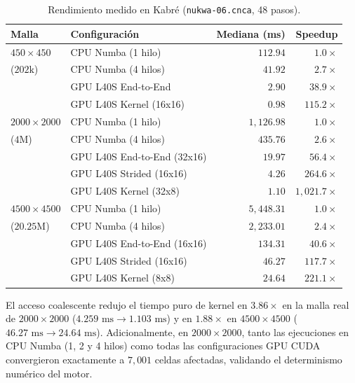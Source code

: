 \documentclass[twocolumn,10pt]{article}
\begin{document}
\begin{table}[H]
\centering
\caption{Rendimiento medido en Kabré (\texttt{nukwa-06.cnca}, 48 pasos).}
\label{tab:bench}
\small
\begin{tabular}{@{}llrr@{}}
\toprule
Malla & Configuración & Mediana (ms) & Speedup \\
\midrule
$450\times 450$   & CPU Numba (1 hilo)         & $112.94$  & $1.0\times$ \\
($202\text{k}$)   & CPU Numba (4 hilos)        & $41.92$   & $2.7\times$ \\
                  & GPU L40S End-to-End        & $2.90$    & $38.9\times$ \\
                  & GPU L40S Kernel (16x16)    & $0.98$    & $115.2\times$ \\
\midrule
$2000\times 2000$ & CPU Numba (1 hilo)         & $1{,}126.98$ & $1.0\times$ \\
($4\text{M}$)     & CPU Numba (4 hilos)        & $435.76$  & $2.6\times$ \\
                  & GPU L40S End-to-End (32x16)& $19.97$   & $56.4\times$ \\
                  & GPU L40S Strided (16x16)   & $4.26$    & $264.6\times$ \\
                  & GPU L40S Kernel (32x8)     & $1.10$    & $1{,}021.7\times$ \\
\midrule
$4500\times 4500$ & CPU Numba (1 hilo)         & $5{,}448.31$ & $1.0\times$ \\
($20.25\text{M}$) & CPU Numba (4 hilos)        & $2{,}233.01$ & $2.4\times$ \\
                  & GPU L40S End-to-End (16x16)& $134.31$  & $40.6\times$ \\
                  & GPU L40S Strided (16x16)   & $46.27$   & $117.7\times$ \\
                  & GPU L40S Kernel (8x8)      & $24.64$   & $221.1\times$ \\
\bottomrule
\end{tabular}
\end{table}

El acceso coalescente redujo el tiempo puro de kernel en $3.86\times$ en la malla real de $2000\times 2000$ ($4.259\text{ ms} \to 1.103\text{ ms}$) y en $1.88\times$ en $4500\times 4500$ ($46.27\text{ ms} \to 24.64\text{ ms}$). Adicionalmente, en $2000\times 2000$, tanto las ejecuciones en CPU Numba (1, 2 y 4 hilos) como todas las configuraciones GPU CUDA convergieron exactamente a $7{,}001$ celdas afectadas, validando el determinismo numérico del motor.
\end{document}
